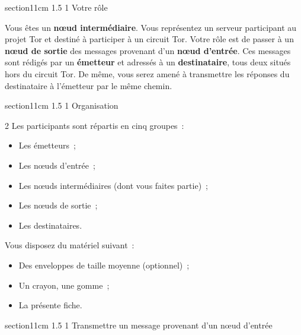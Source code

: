 \documentclass[a4paper,twoside,french]{article}
\makeatletter
\renewcommand\section{\@startsection
  {section}{1}{1cm}%
  {1.5\baselineskip}%
  {1\baselineskip}%
  {\normalfont\Large\bfseries}}%
\makeatother
\begin{document}
  \section{Votre rôle}

  Vous êtes un \textbf{n\oe ud intermédiaire}. Vous représentez un
  serveur participant au projet Tor et destiné à participer à un
  circuit Tor. Votre rôle est de passer à un \textbf{n\oe ud de sortie}
  des messages provenant d'un \textbf{n\oe ud d'entrée}. Ces messages
  sont rédigés par un \textbf{émetteur} et adressés à un
  \textbf{destinataire}, tous deux situés hors du circuit Tor. De
  même, vous serez amené à transmettre les réponses du destinataire à
  l'émetteur par le même chemin.
  
  \section{Organisation}

  \begin{multicols}{2}
    Les participants sont répartis en cinq groupes~:
    \begin{itemize}
    \item Les émetteurs~;
    \item Les n\oe uds d'entrée~;
    \item Les n\oe uds intermédiaires (dont vous faites partie)~;
    \item Les n\oe uds de sortie~;
    \item Les destinataires.
    \end{itemize}
    \vfill\columnbreak

    Vous disposez du matériel suivant~:
    \begin{itemize}
    \item Des enveloppes de taille moyenne (optionnel)~;
    \item Un crayon, une gomme~;
    \item La présente fiche.
    \end{itemize}
  \end{multicols}

  \section{Transmettre un message provenant d'un n\oe ud d'entrée}
\end{document}
